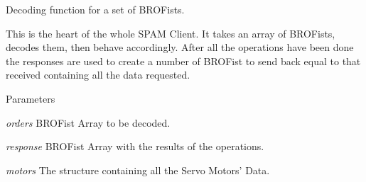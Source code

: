 Decoding function for a set of BROFists. 

This is the heart of the whole SPAM Client. It takes an array of BROFists, decodes them, then behave accordingly. After all the operations have been done the responses are used to create a number of BROFist to send back equal to that received containing all the data requested.


\begin{DoxyParams}{Parameters}
\item[{\em orders}]BROFist Array to be decoded. \item[{\em response}]BROFist Array with the results of the operations. \item[{\em motors}]The structure containing all the Servo Motors' Data. \end{DoxyParams}

